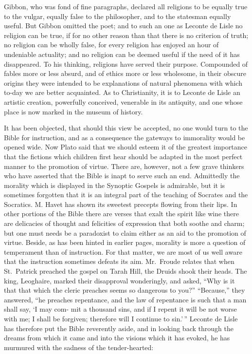 \documentclass[]{book}
\begin{document}
Gibbon, who was fond of fine paragraphs, declared all religions to be
equally true to the vulgar, equally false to the philosopher, and to the
statesman equally useful. But Gibbon omitted the poet; and to such an
one as Leconte de Lisle no religion can be true, if for no other reason
than that there is no criterion of truth; no religion can be wholly
false, for every religion has enjoyed an hour of undeniable actuality;
and no religion can be deemed useful if the need of it has disappeared.
To his thinking, religions have served their purpose. Compounded of
fables more or less absurd, and of ethics more or less wholesome, in
their obscure origins they were intended to be explanations of natural
phenomena with which to-day we are better acquainted. As to
Christianity, it is to Leconte de Lisle an artistic creation, powerfully
conceived, venerable in its antiquity, and one whose place is now marked
in the museum of history.

It has been objected, that should this view be accepted, no one would
turn to the Bible for instruction, and as a consequence the gateways to
immorality would be opened wide. Now Plato said that we should esteem it
of the greatest importance that the fictions which children first hear
should be adapted in the most perfect manner to the promotion of virtue.
There are, however, not a few grave thinkers who have asserted that the
Bible is inapt to serve such an end. Admittedly the morality which is
displayed in the Synoptic Gospels is admirable, but it is sometimes
forgotten that it is an integral part of the teaching of Socrates and
the Socratics. M. Havet has shown its sweetest precepts flowing from
their lips. In other portions of the Bible there are verses that exalt
the spirit like wine there are delicacies of thought and felicities of
expression that both soothe and charm; but one must needs be a
paradoxist to claim either as an aid to the promotion of virtue. Beside,
as has been hinted in earlier pages, morality is more a question of
temperament than of instruction. For that matter, we are most of us well
aware that the instruction sometimes defeats its aim. Mr.~Froude relates
that when St.~Patrick preached the gospel on Tarah Hill, the Druids
shook their heads. The king, Leoghaire, marked their disapproval
wonderingly, and asked, ``Why is it that that which the cleric preaches
seems so dangerous to you?'' ``Because,'' they answered, ``he preaches
repentance, and the law of repentance is such that a man shall say, `I
may com- mit a thousand sins, and if I repent it will be not worse with
me; I shall be forgiven; therefore will I continue to sin.'\,'' Leconte
de Lisle has therefore put the Bible reverently aside, and in looking
back through the dreams from which it came and into the visions which it
has evoked, he has murmured with the sadness of the tender-hearted:
\end{document}
